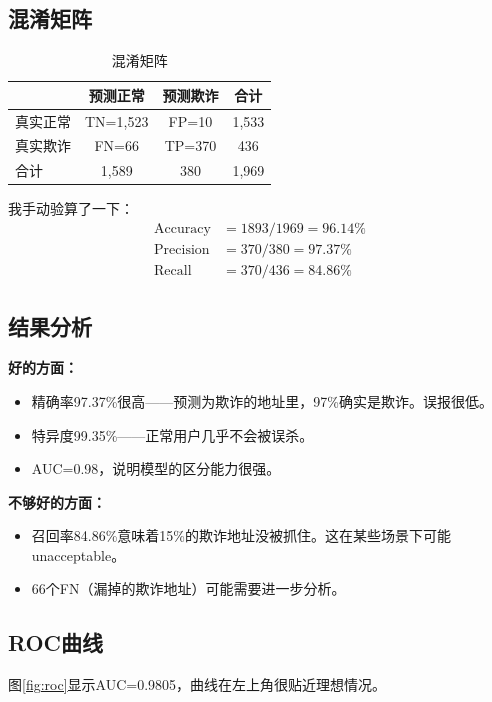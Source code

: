 \documentclass[12pt,a4paper]{article}
\begin{document}
\subsection{混淆矩阵}

\begin{table}[H]
\centering
\caption{混淆矩阵}
\begin{tabular}{@{}lcc|c@{}}
\toprule
 & 预测正常 & 预测欺诈 & 合计 \\
\midrule
真实正常 & TN=1,523 & FP=10 & 1,533 \\
真实欺诈 & FN=66 & TP=370 & 436 \\
\midrule
合计 & 1,589 & 380 & 1,969 \\
\bottomrule
\end{tabular}
\end{table}

我手动验算了一下：
\begin{align}
\text{Accuracy} & = 1893/1969 = 96.14\% \\
\text{Precision} & = 370/380 = 97.37\% \\
\text{Recall} & = 370/436 = 84.86\%
\end{align}

\subsection{结果分析}

\textbf{好的方面：}
\begin{itemize}
    \item 精确率97.37\%很高——预测为欺诈的地址里，97\%确实是欺诈。误报很低。
    \item 特异度99.35\%——正常用户几乎不会被误杀。
    \item AUC=0.98，说明模型的区分能力很强。
\end{itemize}

\textbf{不够好的方面：}
\begin{itemize}
    \item 召回率84.86\%意味着15\%的欺诈地址没被抓住。这在某些场景下可能 unacceptable。
    \item 66个FN（漏掉的欺诈地址）可能需要进一步分析。
\end{itemize}

\subsection{ROC曲线}

图\ref{fig:roc}显示AUC=0.9805，曲线在左上角很贴近理想情况。
\end{document}
